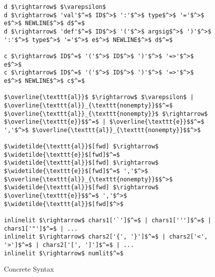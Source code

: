 \begin{figure}
\begin{lstlisting}[mathescape]
d $\rightarrow$ $\varepsilon$
d $\rightarrow$ 'val'$^=$ ID$^>$ ':'$^>$ type$^>$ '='$^>$ e$^>$ NEWLINE$^>$ d$^=$
d $\rightarrow$ 'def'$^=$ ID$^>$ '('$^>$ argsig$^>$ ')'$^>$ ':'$^>$ type$^>$ '='$^>$ e$^>$ NEWLINE$^>$ d$^=$

c $\rightarrow$ ID$^=$ '('$^>$ ID$^>$ ')'$^>$ '=>'$^>$ e$^>$
c $\rightarrow$ ID$^=$ '('$^>$ ID$^>$ ')'$^>$ '=>'$^>$ e$^>$ NEWLINE$^>$ c$^=$

$\overline{\texttt{al}}$ $\rightarrow$ $\varepsilon$ | $\overline{\texttt{al}}_{\texttt{nonempty}}$$^=$
$\overline{\texttt{al}}_{\texttt{nonempty}}$ $\rightarrow$ $\overline{\texttt{e}}$$^=$ | $\overline{\texttt{e}}$$^=$ ','$^>$ $\overline{\texttt{al}}_{\texttt{nonempty}}$$^>$

$\widetilde{\texttt{al}}$[fwd] $\rightarrow$ $\widetilde{\texttt{e}}$[fwd]$^=$
$\widetilde{\texttt{al}}$[fwd] $\rightarrow$ $\widetilde{\texttt{e}}$[fwd]$^=$ ','$^>$ $\overline{\texttt{al}}_{\texttt{nonempty}}$$^>$
$\widetilde{\texttt{al}}$[fwd] $\rightarrow$ $\overline{\texttt{e}}$$^=$ ','$^>$ $\widetilde{\texttt{al}}$[fwd]$^>$

inlinelit $\rightarrow$ chars1['`']$^=$ | chars1[''']$^=$ | chars1['"']$^=$ | ...
inlinelit $\rightarrow$ chars2['{', '}']$^=$ | chars2['<', '>']$^=$ | chars2['[', ']']$^=$ | ...
inlinelit $\rightarrow$ numlit$^=$
\end{lstlisting}
\caption{Concrete Syntax}
\label{f-grammar}
\end{figure}
